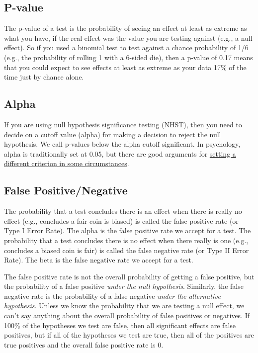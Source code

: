 \documentclass[
  oneside]{book}
\begin{document}
\hypertarget{p-value}{%
\subsection{P-value}\label{p-value}}

The p-value of a test is the probability of seeing an effect at least as extreme as what you have, if the real effect was the value you are testing against (e.g., a null effect). So if you used a binomial test to test against a chance probability of 1/6 (e.g., the probability of rolling 1 with a 6-sided die), then a p-value of 0.17 means that you could expect to see effects at least as extreme as your data 17\% of the time just by chance alone.

\hypertarget{alpha}{%
\subsection{Alpha}\label{alpha}}

If you are using null hypothesis significance testing (NHST), then you need to decide on a cutoff value (alpha) for making a decision to reject the null hypothesis. We call p-values below the alpha cutoff significant. In psychology, alpha is traditionally set at 0.05, but there are good arguments for \href{http://daniellakens.blogspot.com/2019/05/justifying-your-alpha-by-minimizing-or.html}{setting a different criterion in some circumstances}.

\hypertarget{false-pos}{%
\subsection{False Positive/Negative}\label{false-pos}}

The probability that a test concludes there is an effect when there is really no effect (e.g., concludes a fair coin is biased) is called the false positive rate (or Type I Error Rate). The alpha is the false positive rate we accept for a test. The probability that a test concludes there is no effect when there really is one (e.g., concludes a biased coin is fair) is called the false negative rate (or Type II Error Rate). The beta is the false negative rate we accept for a test.

\begin{info}
The false positive rate is not the overall probability of getting a false positive, but the probability of a false positive \emph{under the null hypothesis}. Similarly, the false negative rate is the probability of a false negative \emph{under the alternative hypothesis}. Unless we know the probability that we are testing a null effect, we can't say anything about the overall probability of false positives or negatives. If 100\% of the hypotheses we test are false, then all significant effects are false positives, but if all of the hypotheses we test are true, then all of the positives are true positives and the overall false positive rate is 0.

\end{info}
\end{document}

